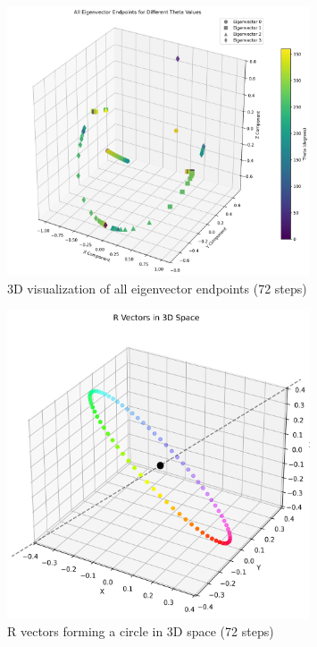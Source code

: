 \begin{figure}[H]
    \centering
    \includegraphics[width=0.8\textwidth]{../example_use/arrowhead_matrix/testing/plots/eigenvectors_no_labels.png}
    \caption{3D visualization of all eigenvector endpoints (72 steps)}
    \label{fig:eigenvectors_no_labels_gen_12}
\end{figure}

\begin{figure}[H]
    \centering
    \includegraphics[width=0.8\textwidth]{../example_use/arrowhead_matrix/testing/plots/r_vectors_3d.png}
    \caption{R vectors forming a circle in 3D space (72 steps)}
    \label{fig:r_vectors_3d_gen_12}
\end{figure}
